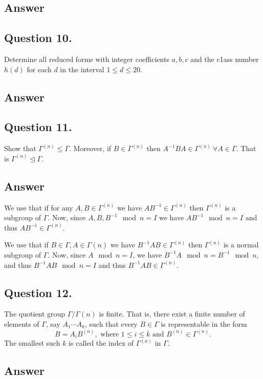 \subsection*{Answer}
\noindent
[TBD]


\subsection{Question 10.}
\noindent
Determine all reduced forms with integer coefficients $a, b, c$ and the c1ass number $h(d)$ for each $d$ in the
interval $1 \leq d \leq 20$.

\subsection*{Answer}
\noindent
[TBD]


\subsection{Question 11.}
\noindent
Show that $\Gamma^{(n)} \leqslant \Gamma$. Moreover, if $B \in \Gamma^{(n)}$ then
$A^{-1} B A \in \Gamma^{(n)} \ \forall A \in \Gamma$. That is $\Gamma^{(n)} \mathrel{\unlhd} \Gamma$.

\subsection*{Answer}
\noindent
We use that if for any $A,B \in \Gamma^{(n)}$ we have $AB^{-1} \in \Gamma^{(n)}$ then $\Gamma^{(n)}$ is a subgroup
of $\Gamma$. Now, since $A,B,B^{-1} \mod n =I$ we have $AB^{-1} \mod n = I$ and thus $AB^{-1} \in \Gamma^{(n)}$.

\noindent
We use that if $B \in \Gamma, A \in \Gamma{(n)}$ we have $B^{-1}AB \in \Gamma^{(n)}$ then $\Gamma^{(n)}$ is a normal
subgroup of $\Gamma$. Now, since $A \mod n = I$, we have $B^{-1}A \mod n = B^{-1} \mod n$, and
thus $B^{-1}AB \mod n = I$ and thus $B^{-1}AB \in \Gamma^{(n)}$.


\subsection{Question 12.}
\noindent
The quotient group $\Gamma / \Gamma{(n)}$ is finite. That is, there exist a finite number of elements of
$\Gamma$, say $A_1 \cdots A_k$, such that every $B \in \Gamma$ is representable in the form
\[
    B=A_i B^{(n)}, \text{ where } 1 \leq i \leq k \text{ and } B^{(n)} \in \Gamma^{(n)}.
\]
The smallest such $k$ is called the index of $\Gamma^{(n)}$ in $\Gamma$.


\subsection*{Answer}
\noindent
[TBD]